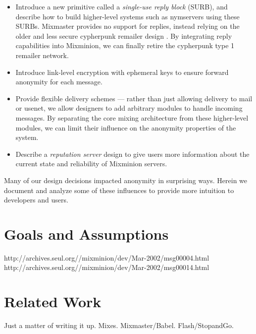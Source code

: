 \documentclass{llncs}
\begin{document}
\begin{itemize}
\item Introduce a new primitive called a \emph{single-use reply block}
(SURB), and describe how to build higher-level systems such as nymservers
using these SURBs. Mixmaster provides no support for replies, instead
relying on the older and less secure cypherpunk remailer design
\cite{cypherpunk-remailer}.  By integrating reply capabilities into
Mixminion, we can finally retire the cypherpunk type 1 remailer network.
\item Introduce link-level encryption with ephemeral keys to ensure
forward anonymity for each message.
\item Provide flexible delivery schemes --- rather than just allowing
delivery to mail or usenet, we allow designers to add arbitrary modules to
handle incoming messages. By separating the core mixing architecture from
these higher-level modules, we can limit their influence on the anonymity
properties of the system.
\item Describe a \emph{reputation server} design to give users more
information about the current state and reliability of Mixminion servers.
\end{itemize}

Many of our design decisions impacted anonymity in surprising ways. Herein
we document and analyze some of these influences to provide more intuition
to developers and users.



\section{Goals and Assumptions}


http://archives.seul.org//mixminion/dev/Mar-2002/msg00004.html
http://archives.seul.org//mixminion/dev/Mar-2002/msg00014.html


\section{Related Work}

Just a matter of writing it up. Mixes. Mixmaster/Babel. Flash/StopandGo.
\end{document}
